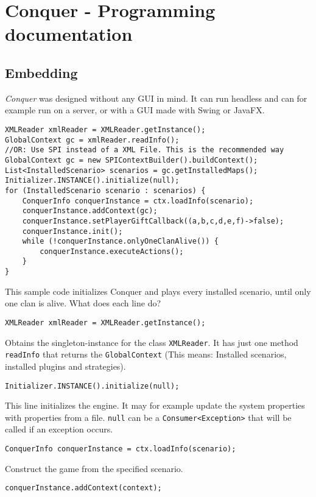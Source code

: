 \documentclass{article}
\begin{document}
\tableofcontents
\newpage
\section{Conquer - Programming documentation}
\subsection{Embedding}
\textit{Conquer} was designed without any GUI in mind. It can run headless and can for example run on a server, or with a GUI made with Swing or JavaFX.
\begin{verbatim}
XMLReader xmlReader = XMLReader.getInstance();
GlobalContext gc = xmlReader.readInfo();
//OR: Use SPI instead of a XML File. This is the recommended way
GlobalContext gc = new SPIContextBuilder().buildContext();
List<InstalledScenario> scenarios = gc.getInstalledMaps();
Initializer.INSTANCE().initialize(null);
for (InstalledScenario scenario : scenarios) {
	ConquerInfo conquerInstance = ctx.loadInfo(scenario);
	conquerInstance.addContext(gc);
	conquerInstance.setPlayerGiftCallback((a,b,c,d,e,f)->false);
	conquerInstance.init();
	while (!conquerInstance.onlyOneClanAlive()) {
		conquerInstance.executeActions();
	}
}
\end{verbatim}
This sample code initializes Conquer and plays every installed scenario, until only one clan is alive.\newline
What does each line do?\newline
\begin{verbatim}
XMLReader xmlReader = XMLReader.getInstance();
\end{verbatim}
Obtains the singleton-instance for the class \texttt{XMLReader}. It has just one method \texttt{readInfo} that returns the \texttt{GlobalContext} (This means: Installed scenarios,
installed plugins and strategies).
\begin{verbatim}
Initializer.INSTANCE().initialize(null);
\end{verbatim}
This line initializes the engine. It may for example update the system properties with properties from a file. \texttt{null} can be a \texttt{Consumer<Exception>} that will be called if an exception 
occurs.
\begin{verbatim}
ConquerInfo conquerInstance = ctx.loadInfo(scenario);
\end{verbatim}
Construct the game from the specified scenario.
\begin{verbatim}
conquerInstance.addContext(context);
\end{verbatim}
\end{document}
